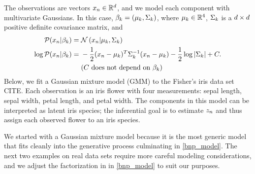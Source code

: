 \begin{ex}
%
The observations are vectors $x_n \in \mathbb{R}^d$,
and we model each component with multivariate Gaussians.
In this case, $\beta_k = (\mu_k, \Sigma_k)$,
where $\mu_k \in \mathbb{R}^4$, $\Sigma_k$ is a $d\times d$ positive
definite covariance matrix, and
%
\begin{align*}
%
\p(\x_\n \vert \beta_\k) ={}& \normdist{\x_n \vert \mu_\k, \Sigma_\k} \\
\logp(\x_\n \vert \beta_\k) ={}&
    -\frac{1}{2}(\x_n - \mu_k)^T \Sigma_\k^{-1} (\x_n - \mu_k)
    -\frac{1}{2} \log |\Sigma_\k| + \const.\\
    & \constdesc{\beta_\k}
%
\end{align*}
Below, we fit a
Gaussian mixture model (GMM) to the Fisher's iris data set CITE.
Each observation is an iris flower with
four measurements:
sepal length, sepal width, petal length, and petal width.
The components in this model can be interpreted as latent iris species;
the inferential goal is to estimate $z_n$ and thus assign each
observed flower to an iris species.

%
\end{ex}

We started with a Gaussian mixture model
because it is the most generic model that fits cleanly into the
generative process culminating in \eqref{bnp_model}.
The next two examples on real data sets require more careful modeling considerations,
and we adjust the factorization in in \eqref{bnp_model} to suit our purposes.


